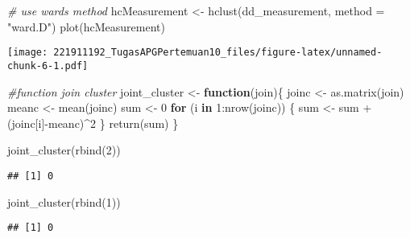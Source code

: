 \documentclass[
]{article}
\newenvironment{Shaded}{\begin{snugshade}}{\end{snugshade}}
\newcommand{\AttributeTok}[1]{\textcolor[rgb]{0.77,0.63,0.00}{#1}}
\newcommand{\CommentTok}[1]{\textcolor[rgb]{0.56,0.35,0.01}{\textit{#1}}}
\newcommand{\ControlFlowTok}[1]{\textcolor[rgb]{0.13,0.29,0.53}{\textbf{#1}}}
\newcommand{\DecValTok}[1]{\textcolor[rgb]{0.00,0.00,0.81}{#1}}
\newcommand{\FunctionTok}[1]{\textcolor[rgb]{0.00,0.00,0.00}{#1}}
\newcommand{\NormalTok}[1]{#1}
\newcommand{\OtherTok}[1]{\textcolor[rgb]{0.56,0.35,0.01}{#1}}
\newcommand{\SpecialCharTok}[1]{\textcolor[rgb]{0.00,0.00,0.00}{#1}}
\newcommand{\StringTok}[1]{\textcolor[rgb]{0.31,0.60,0.02}{#1}}
\begin{document}
\begin{Shaded}
\begin{Highlighting}[]
\CommentTok{\# use ward\textquotesingle{}s method}
\NormalTok{hcMeasurement }\OtherTok{\textless{}{-}} \FunctionTok{hclust}\NormalTok{(dd\_measurement, }\AttributeTok{method =} \StringTok{"ward.D"}\NormalTok{)}
\FunctionTok{plot}\NormalTok{(hcMeasurement)}
\end{Highlighting}
\end{Shaded}

\texttt{[image: 221911192\_TugasAPGPertemuan10\_files/figure-latex/unnamed-chunk-6-1.pdf]}

\begin{Shaded}
\begin{Highlighting}[]
\CommentTok{\#function join cluster}
\NormalTok{joint\_cluster }\OtherTok{\textless{}{-}} \ControlFlowTok{function}\NormalTok{(join)\{}
\NormalTok{    joinc }\OtherTok{\textless{}{-}} \FunctionTok{as.matrix}\NormalTok{(join)}
\NormalTok{    meanc }\OtherTok{\textless{}{-}} \FunctionTok{mean}\NormalTok{(joinc)}
\NormalTok{    sum }\OtherTok{\textless{}{-}} \DecValTok{0}
    \ControlFlowTok{for}\NormalTok{ (i }\ControlFlowTok{in} \DecValTok{1}\SpecialCharTok{:}\FunctionTok{nrow}\NormalTok{(joinc)) \{}
\NormalTok{      sum }\OtherTok{\textless{}{-}}\NormalTok{ sum }\SpecialCharTok{+}\NormalTok{ (joinc[i]}\SpecialCharTok{{-}}\NormalTok{meanc)}\SpecialCharTok{\^{}}\DecValTok{2} 
\NormalTok{    \}}
    \FunctionTok{return}\NormalTok{(sum)}
\NormalTok{\}}
\end{Highlighting}
\end{Shaded}

\begin{Shaded}
\begin{Highlighting}[]
\FunctionTok{joint\_cluster}\NormalTok{(}\FunctionTok{rbind}\NormalTok{(}\DecValTok{2}\NormalTok{))}
\end{Highlighting}
\end{Shaded}

\begin{verbatim}
## [1] 0
\end{verbatim}

\begin{Shaded}
\begin{Highlighting}[]
\FunctionTok{joint\_cluster}\NormalTok{(}\FunctionTok{rbind}\NormalTok{(}\DecValTok{1}\NormalTok{))}
\end{Highlighting}
\end{Shaded}

\begin{verbatim}
## [1] 0
\end{verbatim}
\end{document}
